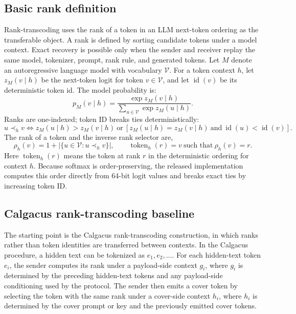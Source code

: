 \documentclass[fleqn,10pt]{wlscirep}
\begin{document}
\subsection*{Basic rank definition}\label{sec:rank-method}

Rank-transcoding uses the rank of a token in an LLM next-token ordering as the transferable object. A rank is defined by sorting candidate tokens under a model context. Exact recovery is possible only when the sender and receiver replay the same model, tokenizer, prompt, rank rule, and generated tokens.
Let \(M\) denote an autoregressive language model with vocabulary \(\mathcal{V}\). For a token context \(h\), let \(z_M(v\mid h)\) be the next-token logit for token \(v\in\mathcal{V}\), and let \(\operatorname{id}(v)\) be its deterministic token id. The model probability is:
\begin{equation}
p_M(v\mid h)=
\frac{\exp z_M(v\mid h)}
{\sum_{u\in\mathcal V}\exp z_M(u\mid h)}.
\label{eq:next-token-prob}
\end{equation}
Ranks are one-indexed; token ID breaks ties deterministically:
\begin{equation}
u \prec_h v
\Longleftrightarrow
z_M(u\mid h)>z_M(v\mid h)
\ \text{or}\
\left[z_M(u\mid h)=z_M(v\mid h)\ \text{and}\ \operatorname{id}(u)<\operatorname{id}(v)\right].
\label{eq:rank-order}
\end{equation}
The rank of a token and the inverse rank selector are,
\begin{equation}
\rho_h(v)=1+\left|\{u\in\mathcal V:u\prec_h v\}\right|,
\qquad
\operatorname{token}_h(r)=v\ \text{such that}\ \rho_h(v)=r.
\label{eq:rank-function}
\end{equation}
Here \(\operatorname{token}_h(r)\) means the token at rank \(r\) in the deterministic ordering for context \(h\). Because softmax is order-preserving, the released implementation computes this order directly from 64-bit logit values and breaks exact ties by increasing token ID.

\subsection*{Calgacus rank-transcoding baseline}\label{sec:calgacus-method}

The starting point is the Calgacus rank-transcoding construction, in which ranks rather than token identities are transferred between contexts\cite{NorelliBronstein2026Calgacus}. In the Calgacus procedure, a hidden text can be tokenized as \(e_1,e_2,\ldots\). For each hidden-text token \(e_i\), the sender computes its rank under a payload-side context \(g_i\), where \(g_i\) is determined by the preceding hidden-text tokens and any payload-side conditioning used by the protocol. The sender then emits a cover token by selecting the token with the same rank under a cover-side context \(h_i\), where \(h_i\) is determined by the cover prompt or key and the previously emitted cover tokens.
\end{document}
